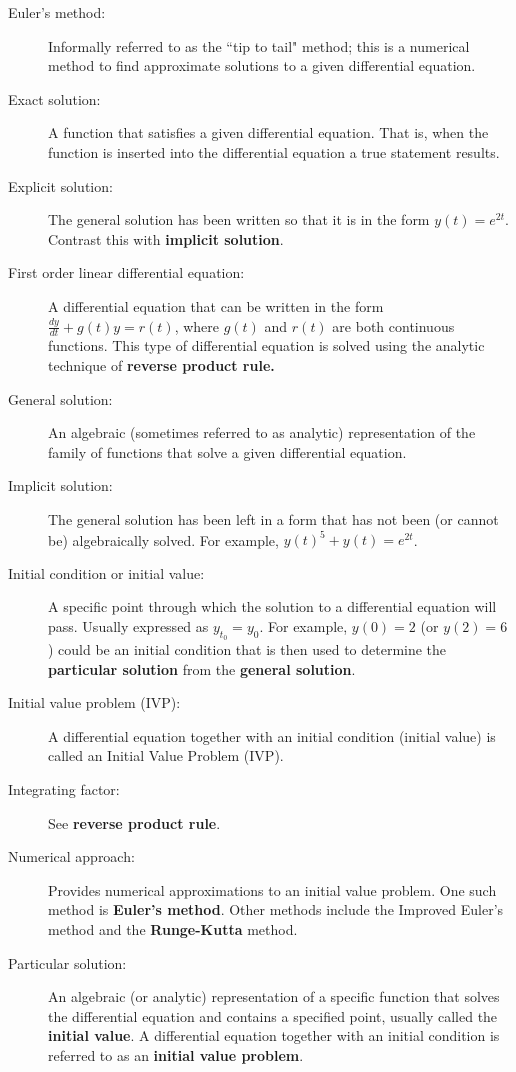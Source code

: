 \begin{description}
\item[Euler's method:] Informally referred to as the ``tip to tail" method; this is a numerical method to find approximate solutions to a given differential equation.
\item[Exact solution:] A function that satisfies a given differential equation. That is, when the function is inserted into the differential equation a true statement results.
\item[Explicit solution:] The general solution has been written so that it is in the form $y(t) = e^{2t}$. Contrast this with \textbf{implicit solution}.
\item[First order linear differential equation:] A differential equation that can be written in the form $\frac{dy}{dt}+ g(t)y =r(t)$, where $g(t)$ and $r(t)$ are both continuous functions. This type of differential equation is solved using the analytic technique of \textbf{reverse product rule.}
\item[General solution:] An algebraic (sometimes referred to as analytic) representation of the family of functions that solve a given differential equation.
\item[Implicit solution:] The general solution has been left in a form that has not been (or cannot be) algebraically solved. For example, $y(t)^5 + y(t) = e^{2t}$.
\item[Initial condition or initial value:] A specific point through which the solution to a differential equation will pass. Usually expressed as $y_{t_0} = y_0$. For example, $y(0)=2$ (or $y(2)=6$) could be an initial condition that is then used to determine the \textbf{particular solution} from the \textbf{general solution}.
\item[Initial value problem (IVP):] A differential equation together with an initial condition (initial value) is called an Initial Value Problem (IVP).
\item[Integrating factor:] See \textbf{reverse product rule}.
\item[Numerical approach:] Provides numerical approximations to an initial value problem. One such method is \textbf{Euler's method}. Other methods include the Improved Euler's method and the \textbf{Runge-Kutta} method.
\item[Particular solution:] An algebraic (or analytic) representation of a specific function that solves the differential equation and contains a specified point, usually called the \textbf{initial value}. A differential equation together with an initial condition is referred to as an \textbf{initial value problem}.

\end{description}
